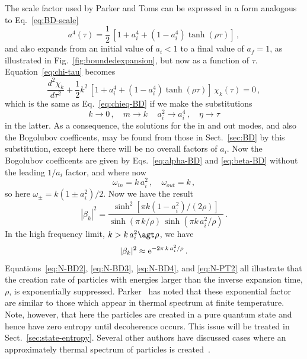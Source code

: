 \documentclass[eqsecnum,floats,aps,prd,floatfix,titlepage,tightenlines]{revtex4}
\begin{document}
 The scale factor used by Parker and Toms can be expressed in a form analogous to Eq.~\eqref{eq:BD-scale}
  \begin{equation}
 a^4(\tau) = \frac{1}{2}\, [1 + a_i^4 +(1-a_i^4) \tanh(\rho \tau)]\,,
 \label{eq:PT-scale}
 \end{equation}
and also expands from an initial value of $a_i < 1$ to a final value of $a_f =1$, as illustrated in Fig.~\ref{fig:boundedexpansion},
but now as a function of $\tau$. Equation~\eqref{eq:chi-tau} becomes
\begin{equation}
 {\frac{d^2\chi_k}{d\tau^2}} + \frac{1}{2}  k^2 \,  \left[1 + a_i^4 +(1-a_i^4) \tanh(\rho \tau)\right]\, \chi_{k}(\tau) =0 \, ,
                                                 \label{eq:chieq-PT}
 \end{equation} 
which is the same as Eq.~\eqref{eq:chieq-BD} if we make the substitutions
 \begin{equation}
 k \rightarrow 0\,, \quad m\rightarrow k\, \quad a_i^2   \rightarrow a_i^4\,, \quad  \eta \rightarrow \tau
 \end{equation}
 in the latter.
 As a consequence, the solutions for the in and out modes, and also the Bogolubov coefficents, may be found 
 from those in Sect.~\ref{sec:BD} by this substitution, except here there will be no overall factors of $a_i$.
 Now the Bogolubov coefficents are given by Eqs.~\eqref{eq:alpha-BD} and \eqref{eq:beta-BD} without the
 leading $1/a_i$ factor, and where now
 \begin{equation}
 \omega_{in} = k\, a_i^2\,,  \quad \omega_{out} = k\,,
 \label{eq:subs}
 \end{equation}
 so here $\omega_\pm = k (1 \pm a_i^2)/2$.
 Now we have the result
  \begin{equation}
  | \beta_k|^2 = \frac{  \sinh^2[\pi k (1-a_i^2)/(2\rho)]}{ \sinh(\pi\, k/\rho)\, \sinh(\pi k\, a_i^2/\rho)}\,.
 \label{eq:N-PT}
 \end{equation}
 In the high frequency limit, $k > k\, a_i^2 \agt \rho$, we have
  \begin{equation}
  | \beta_k|^2 \approx {\rm e}^{-2 \pi\, k \,a_i^2/\rho}\,.
 \label{eq:N-PT2}
 \end{equation}
 Equations~\eqref{eq:N-BD2}, \eqref{eq:N-BD3}, \eqref{eq:N-BD4}, and \eqref{eq:N-PT2} all illustrate that the creation rate of
 particles with energies larger than the inverse expansion time, $\rho$, is exponentially suppressed. Parker~\cite{Parker76} has
 noted that these exponential factor  are similar to those which appear in thermal spectrum at finite temperature. Note, however,
 that here the particles are created in a pure quantum state and hence have zero entropy until decoherence occurs. This issue  
 will be treated in Sect.~\ref{sec:state-entropy}.  Several other authors have discussed cases where an approximately thermal
 spectrum of particles is created~\cite{HuRaval96,Koks97,Mersini98,Biswas02}.
 
\end{document}
